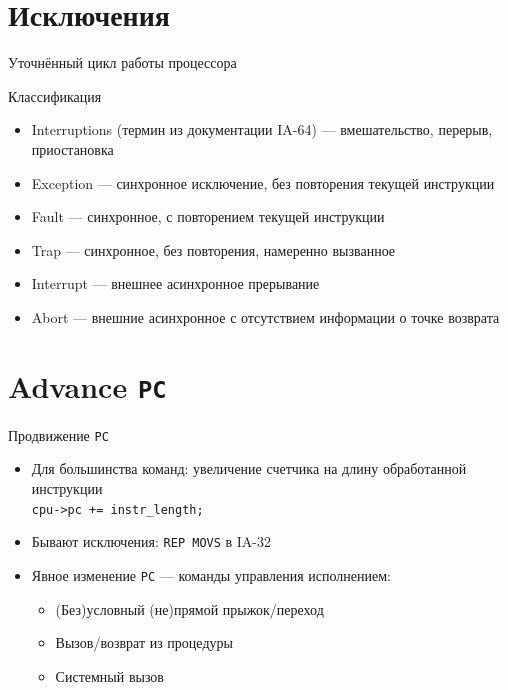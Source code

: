\documentclass{beamer}
\begin{document}
\section{Исключения}

\begin{frame}[shrink=0.6]{Уточнённый цикл работы процессора}
\centering



\end{frame}

\begin{frame}{Классификация} %
\begin{itemize}
\item Interruptions (термин из документации IA-64) — вмешательство, перерыв, приостановка
\item Exception — синхронное исключение, без повторения текущей инструкции
\item Fault — синхронное, с повторением текущей инструкции
\item Trap — синхронное, без повторения, намеренно вызванное
\item Interrupt — внешнее асинхронное прерывание
\item Abort — внешние асинхронное с отсутствием информации о точке возврата
\end{itemize}
\end{frame}

\section{Advance \texttt{PC}}

\begin{frame}{Продвижение \texttt{PC}}

\begin{itemize}
    \item Для большинства команд: увеличение счетчика на длину обработанной инструкции\\
    \texttt{cpu->pc += instr_length;}\\\pause
    \item Бывают исключения: \texttt{REP MOVS} в IA-32\pause
    \item Явное изменение \texttt{PC} — команды управления исполнением:
    \begin{itemize}
        \item (Без)условный (не)прямой прыжок/переход
        \item Вызов/возврат из процедуры
        \item Системный вызов
    \end{itemize}
\end{itemize}

\end{frame}
\end{document}
